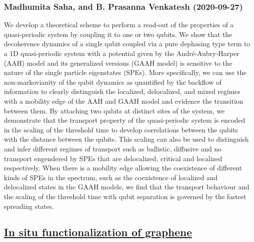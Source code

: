 \subsubsection*{Madhumita Saha, and B. Prasanna Venkatesh (2020-09-27)}
We develop a theoretical scheme to perform a read-out of the properties of a
quasi-periodic system by coupling it to one or two qubits. We show that the
decoherence dynamics of a single qubit coupled via a pure dephasing type term
to a 1D quasi-periodic system with a potential given by the
Andr\'e-Aubry-Harper (AAH) model and its generalized versions (GAAH model) is
sensitive to the nature of the single particle eigenstates (SPEs). More
specifically, we can use the non-markovianity of the qubit dynamics as
quantified by the backflow of information to clearly distinguish the localized,
delocalized, and mixed regimes with a mobility edge of the AAH and GAAH model
and evidence the transition between them. By attaching two qubits at distinct
sites of the system, we demonstrate that the transport property of the
quasi-periodic system is encoded in the scaling of the threshold time to
develop correlations between the qubits with the distance between the qubits.
This scaling can also be used to distinguish and infer different regimes of
transport such as ballistic, diffusive and no transport engendered by SPEs that
are delocalized, critical and localized respectively. When there is a mobility
edge allowing the coexistence of different kinds of SPEs in the spectrum, such
as the coexistence of localized and delocalized states in the GAAH models, we
find that the transport behaviour and the scaling of the threshold time with
qubit separation is governed by the fastest spreading states.

\subsection*{\href{http://arxiv.org/abs/2009.12808v1}{In situ functionalization of graphene}}
